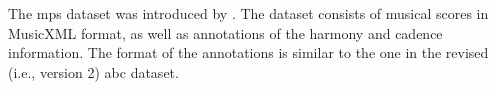 

The \gls{mps} dataset was introduced by
\textcite{hentschel2021annotated}. The dataset consists of
musical scores in MusicXML format, as well as annotations of
the harmony and cadence information. The format of the
annotations is similar to the one in the revised (i.e.,
version 2) \gls{abc} dataset.
